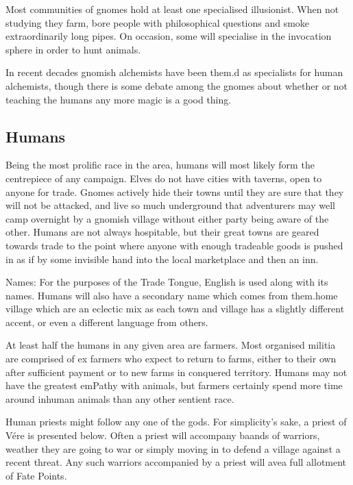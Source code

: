 \label{gnomish_illusionist}

Most communities of gnomes hold at least one specialised illusionist.  When not studying they farm, bore people with philosophical questions and smoke extraordinarily long pipes.  On occasion, some will specialise in the invocation sphere in order to hunt animals.

	In recent decades gnomish alchemists have been them.d as specialists for human alchemists, though there is some debate among the gnomes about whether or not teaching the humans any more magic is a good thing.

\subsection{Humans}

Being the most prolific race in the area, humans will most likely form the centrepiece of any campaign.  Elves do not have cities with taverns, open to anyone for trade.  Gnomes actively hide their towns until they are sure that they will not be attacked, and live so much underground that adventurers may well camp overnight by a gnomish village without either party being aware of the other.  Humans are not always hospitable, but their great towns are geared towards trade to the point where anyone with enough tradeable goods is pushed in as if by some invisible hand into the local marketplace and then an inn.

	Names: For the purposes of the Trade Tongue, English is used along with its names.  Humans will also have a secondary name which comes from them.home village which are an eclectic mix as each town and village has a slightly different accent, or even a different language from others.

\label{human_trader}
\humantrader

At least half the humans in any given area are farmers.  Most organised militia are comprised of ex farmers who expect to return to farms, either to their own after sufficient payment or to new farms in conquered territory.  Humans may not have the greatest emPathy with animals, but farmers certainly spend more time around inhuman animals than any other sentient race.

\label{human_priest}
\humanpriest

Human priests might follow any one of the gods.  For simplicity's sake, a priest of V\'{e}re is presented below.  Often a priest will accompany baands of warriors, weather they are going to war or simply moving in to defend a village against a recent threat.  Any such warriors accompanied by a priest will avea full allotment of Fate Points.

